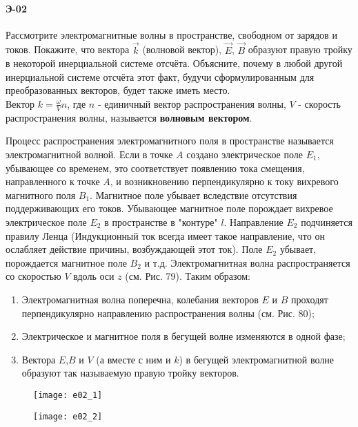 \documentclass[__main__.tex]{subfiles}
\begin{document}
\paragraph{Э-02}
Рассмотрите электромагнитные волны в пространстве, свободном от зарядов и токов. Покажите, что вектора $\vec{k}$ (волновой вектор), $\vec{E}$, $\vec{B}$ образуют правую тройку в некоторой инерциальной системе отсчёта. Объясните, почему в любой другой инерциальной системе отсчёта этот факт, будучи сформулированным для преобразованных векторов, будет также иметь место.\\

Вектор $k = \frac{\omega}{V} n$, где $n$ - единичный вектор распространения волны, $V$ - скорость распространения волны, называется \textbf{волновым вектором}.

Процесс распространения электромагнитного поля в пространстве называется электромагнитной волной. Если в точке $A$ создано электрическое поле $E_1$, убывающее со временем, это соответствует появлению тока смещения, направленного к точке $A$, и возникновению перпендикулярно к току вихревого магнитного поля $B_1$. Магнитное поле убывает вследствие отсутствия поддерживающих его токов. Убывающее магнитное поле порождает вихревое электрическое поле $E_2$ в пространстве в "контуре" $l$. Направление $E_2$ подчиняется правилу Ленца (Индукционный ток всегда имеет такое направление, что он ослабляет действие причины, возбуждающей этот ток). Поле $E_2$ убывает, порождается магнитное поле $B_2$ и т.д. Электромагнитная волна распространяется со скоростью $V$ вдоль оси $z$ (см. Рис. 79). Таким образом:

\begin{enumerate}
\item
Электромагнитная волна поперечна, колебания векторов $E$ и $B$ проходят перпендикулярно направлению распространения волны (см. Рис. 80);
\item
Электрическое и магнитное поля в бегущей волне изменяются в одной фазе;
\item
Вектора $E$,$B$ и $V$ (а вместе с ним и $k$) в бегущей электромагнитной волне образуют так называемую правую тройку векторов.
\end{enumerate}

\begin{figure}[h]
\begin{minipage}{.45\linewidth}
    \texttt{[image: e02\_1]}
\end{minipage}
\hfill
\begin{minipage}{.45\linewidth}
    \texttt{[image: e02\_2]}
\end{minipage}
\end{figure}
\end{document}
